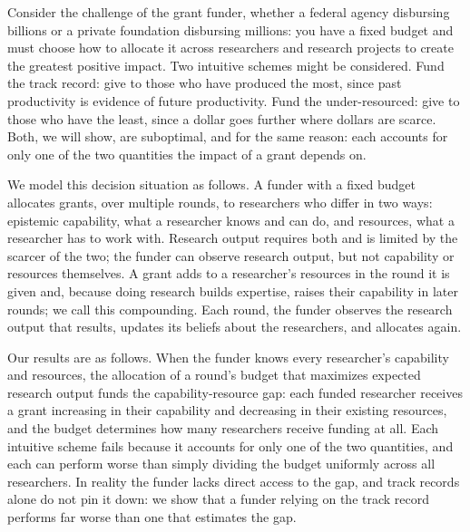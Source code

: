 \documentclass[article, 11pt, reqno]{amsart}
\theoremstyle{named}
\begin{document}
Consider the challenge of the grant funder, whether a federal agency disbursing billions or a private foundation disbursing millions: you have a fixed budget and must choose how to allocate it across researchers and research projects to create the greatest positive impact. Two intuitive schemes might be considered. Fund the track record: give to those who have produced the most, since past productivity is evidence of future productivity. Fund the under-resourced: give to those who have the least, since a dollar goes further where dollars are scarce. Both, we will show, are suboptimal, and for the same reason: each accounts for only one of the two quantities the impact of a grant depends on.

We model this decision situation as follows. A funder with a fixed budget allocates grants, over multiple rounds, to researchers who differ in two ways: epistemic capability, what a researcher knows and can do, and resources, what a researcher has to work with. Research output requires both and is limited by the scarcer of the two; the funder can observe research output, but not capability or resources themselves. A grant adds to a researcher's resources in the round it is given and, because doing research builds expertise, raises their capability in later rounds; we call this compounding. Each round, the funder observes the research output that results, updates its beliefs about the researchers, and allocates again.

Our results are as follows. When the funder knows every researcher's capability and resources, the allocation of a round's budget that maximizes expected research output funds the capability-resource gap: each funded researcher receives a grant increasing in their capability and decreasing in their existing resources, and the budget determines how many researchers receive funding at all. Each intuitive scheme fails because it accounts for only one of the two quantities, and each can perform worse than simply dividing the budget uniformly across all researchers. In reality the funder lacks direct access to the gap, and track records alone do not pin it down: we show that a funder relying on the track record performs far worse than one that estimates the gap.
\end{document}
